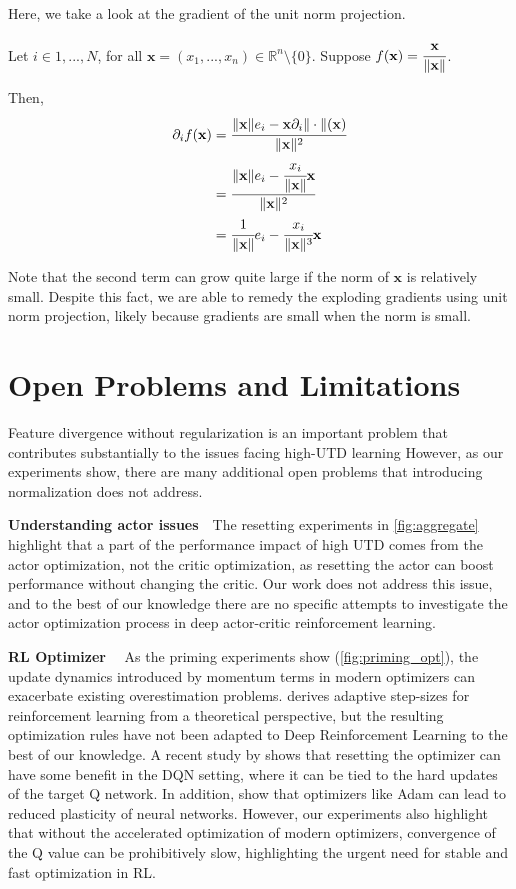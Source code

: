 Here, we take a look at the gradient of the unit norm projection.

Let $i \in {1, ..., N}$, for all $\mathbf{x} = (x_1, ..., x_n) \in \mathbb{R}^n \setminus \{0\}$. Suppose $f(\mathbf{x}) = \cfrac{\mathbf{x}}{\| \mathbf{x} \|}$. 

Then, 
\begin{align*}
    \partial_i f(\mathbf{x}) 
    &= \cfrac{\| \mathbf{x} \| e_i - \mathbf{x} \partial_i \| \cdot \| (\mathbf{x}) }{\|\mathbf{x} \|^2} \\
    &= \cfrac{\| \mathbf{x} \| e_i - \cfrac{x_i}{\|\mathbf{x} \|} \mathbf{x}}{\|\mathbf{x} \|^2} \\
    &= \cfrac{1}{\|\mathbf{x} \|} e_i - \cfrac{x_i}{\|\mathbf{x} \|^3} \mathbf{x}
\end{align*}

Note that the second term can grow quite large if the norm of $\mathbf{x}$ is relatively small. Despite this fact, we are able to remedy the exploding gradients using unit norm projection, likely because gradients are small when the norm is small.

\section{Open Problems and Limitations} \label{app:open}

Feature divergence without regularization is an important problem that contributes substantially to the issues facing high-UTD learning
However, as our experiments show, there are many additional open problems that introducing normalization does not address.

\textbf{Understanding actor issues}~~The resetting experiments in \autoref{fig:aggregate} highlight that a part of the performance impact of high UTD comes from the actor optimization, not the critic optimization, as resetting the actor can boost performance without changing the critic.
Our work does not address this issue, and to the best of our knowledge there are no specific attempts to investigate the actor optimization process in deep actor-critic reinforcement learning.

{\bf RL Optimizer}~~ As the priming experiments show (\autoref{fig:priming_opt}), the update dynamics introduced by momentum terms in modern optimizers can exacerbate existing overestimation problems. 
\textcite{dabney2014adaptive} derives adaptive step-sizes for reinforcement learning from a theoretical perspective, but the resulting optimization rules have not been adapted to Deep Reinforcement Learning to the best of our knowledge.
A recent study by \textcite{asadi2023resetting} shows that resetting the optimizer can have some benefit in the DQN setting, where it can be tied to the hard updates of the target Q network.
In addition, \textcite{lyle2023understanding} show that optimizers like Adam can lead to reduced plasticity of neural networks.
However, our experiments also highlight that without the accelerated optimization of modern optimizers, convergence of the Q value can be prohibitively slow, highlighting the urgent need for stable and fast optimization in RL.

